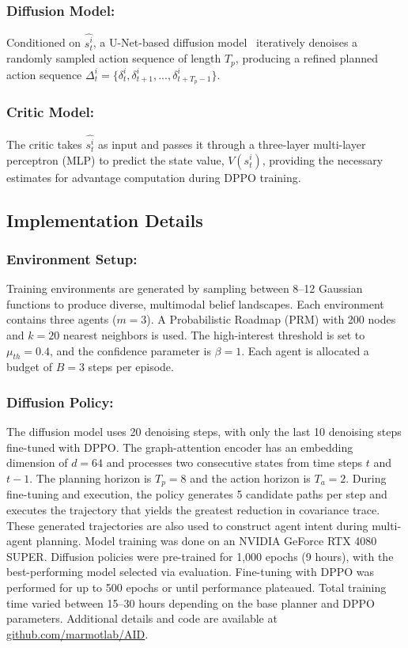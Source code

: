 \documentclass[runningheads]{llncs}
\begin{document}
\subsubsection{Diffusion Model:}
Conditioned on $\hat{s_t^i}$, a U-Net-based diffusion model~\cite{chi2024diffusionpolicy} iteratively denoises a randomly sampled action sequence of length $T_p$, producing a refined planned action sequence $\Delta^i_t = \{\delta^i_t, \delta^i_{t+1}, ..., \delta^i_{t+T_p-1}\}$.

\subsubsection{Critic Model:}
The critic takes $\hat{s_t^i}$ as input and passes it through a three-layer multi-layer perceptron (MLP) to predict the state value, $V(s_t^i)$, providing the necessary estimates for advantage computation during DPPO training.

\subsection{Implementation Details}
\subsubsection{Environment Setup:}
Training environments are generated by sampling between 8--12 Gaussian functions to produce diverse, multimodal belief landscapes. Each environment contains three agents ($m=3$). A Probabilistic Roadmap (PRM) with 200 nodes and $k = 20$ nearest neighbors is used. The high-interest threshold is set to $\mu_{th} = 0.4$, and the confidence parameter is $\beta = 1$. Each agent is allocated a budget of $B = 3$ steps per episode.

\subsubsection{Diffusion Policy:}
The diffusion model uses 20 denoising steps, with only the last 10 denoising steps fine-tuned with DPPO. The graph-attention encoder has an embedding dimension of $d = 64$ and processes two consecutive states from time steps $t$ and $t\!-\!1$. The planning horizon is $T_p = 8$ and the action horizon is $T_a = 2$. During fine-tuning and execution, the policy generates 5 candidate paths per step and executes the trajectory that yields the greatest reduction in covariance trace. These generated trajectories are also used to construct agent intent during multi-agent planning. Model training was done on an NVIDIA GeForce RTX 4080 SUPER. Diffusion policies were pre-trained for 1,000 epochs (9 hours), with the best-performing model selected via evaluation. Fine-tuning with DPPO was performed for up to 500 epochs or until performance plateaued. Total training time varied between 15–30 hours depending on the base planner and DPPO parameters. Additional details and code are available at \href{https://github.com/marmotlab/AID}{github.com/marmotlab/AID}.
\end{document}
